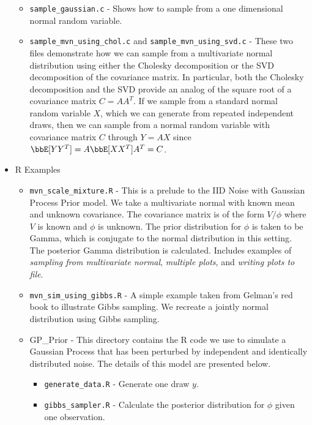 \documentclass{report}
\begin{document}
\begin{itemize}
\begin{itemize}
\item \texttt{sample\_gaussian.c} - Shows how to sample from a one dimensional normal random variable.

\item \texttt{sample\_mvn\_using\_chol.c} and \texttt{sample\_mvn\_using\_svd.c} - These two files demonstrate how we can sample from a multivariate normal distribution using either the Cholesky decomposition or the SVD decomposition of the covariance matrix.  In particular, both the Cholesky decomposition and the SVD provide an analog of the square root of a covariance matrix $C = AA^T$.  If we sample from a standard normal random variable $X$, which we can generate from repeated independent draws, then we can sample from a normal random variable with covariance matrix $C$ through $Y = A X$ since $\bbE[YY^T] = A \bbE[XX^T] A^T = C$.

\end{itemize}

\item R Examples
\begin{itemize}

\item \texttt{mvn\_scale\_mixture.R} - This is a prelude to the IID Noise with Gaussian Process Prior model.  We take a multivariate normal with known mean and unknown covariance.  The covariance matrix is of the form $V/\phi$ where $V$ is known and $\phi$ is unknown. The prior distribution for $\phi$ is taken to be Gamma, which is conjugate to the normal distribution in this setting.  The posterior Gamma distribution is calculated.  Includes examples of \emph{sampling from multivariate normal}, \emph{multiple plots}, and \emph{writing plots to file}.

\item \texttt{mvn\_sim\_using\_gibbs.R} - A simple example taken from Gelman's red book to illustrate Gibbs sampling.  We recreate a jointly normal distribution using Gibbs sampling.

\item GP\_Prior - This directory contains the R code we use to simulate a Gaussian Process that has been perturbed by independent and identically distributed noise.  The details of this model are presented below.

\begin{itemize}

\item \texttt{generate\_data.R} - Generate one draw $y$.

\item \texttt{gibbs\_sampler.R} - Calculate the posterior distribution for $\phi$ given one observation.

\end{itemize}

\end{itemize}

\end{itemize}
\end{document}
